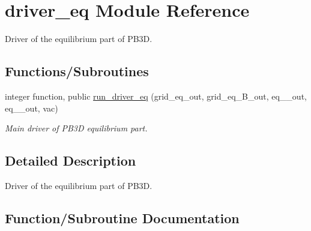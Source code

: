 \hypertarget{namespacedriver__eq}{}\section{driver\+\_\+eq Module Reference}
\label{namespacedriver__eq}


Driver of the equilibrium part of P\+B3D.  


\subsection*{Functions/\+Subroutines}
\begin{DoxyCompactItemize}
\item 
integer function, public \hyperlink{namespacedriver__eq_adc9d5dff288fa512e5ef885627d940cc}{run\+\_\+driver\+\_\+eq} (grid\+\_\+eq\+\_\+out, grid\+\_\+eq\+\_\+\+B\+\_\+out, eq\+\_\+\_\+out, eq\+\_\+\_\+out, vac)
\begin{DoxyCompactList}\small\item\em Main driver of P\+B3D equilibrium part. \end{DoxyCompactList}\end{DoxyCompactItemize}


\subsection{Detailed Description}
Driver of the equilibrium part of P\+B3D. 

\subsection{Function/\+Subroutine Documentation}
\mbox{\label{namespacedriver__eq_adc9d5dff288fa512e5ef885627d940cc}} 
